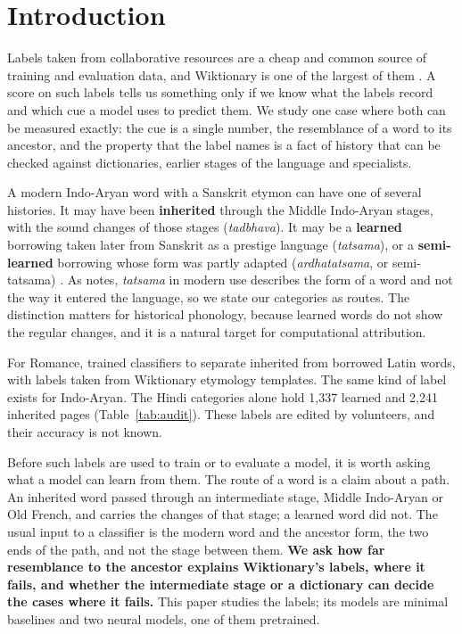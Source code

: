 \documentclass[11pt]{article}
\begin{document}
\section{Introduction}

Labels taken from collaborative resources are a cheap and common source of training and evaluation data, and Wiktionary is one of the largest of them \citep{wu2020computational}. A score on such labels tells us something only if we know what the labels record and which cue a model uses to predict them. We study one case where both can be measured exactly: the cue is a single number, the resemblance of a word to its ancestor, and the property that the label names is a fact of history that can be checked against dictionaries, earlier stages of the language and specialists.

A modern Indo-Aryan word with a Sanskrit etymon can have one of several histories. It may have been \textbf{inherited} through the Middle Indo-Aryan stages, with the sound changes of those stages (\textit{tadbhava}). It may be a \textbf{learned} borrowing taken later from Sanskrit as a prestige language (\textit{tatsama}), or a \textbf{semi-learned} borrowing whose form was partly adapted (\textit{ardhatatsama}, or semi-tatsama) \citep[\S111]{chatterji1926}. As \citeauthor{chatterji1926} notes, \textit{tatsama} in modern use describes the form of a word and not the way it entered the language, so we state our categories as routes. The distinction matters for historical phonology, because learned words do not show the regular changes, and it is a natural target for computational attribution.

For Romance, \citet{cristea2021inherited} trained classifiers to separate inherited from borrowed Latin words, with labels taken from Wiktionary etymology templates. The same kind of label exists for Indo-Aryan. The Hindi categories alone hold 1,337 learned and 2,241 inherited pages (Table~\ref{tab:audit}). These labels are edited by volunteers, and their accuracy is not known.

Before such labels are used to train or to evaluate a model, it is worth asking what a model can learn from them. The route of a word is a claim about a path. An inherited word passed through an intermediate stage, Middle Indo-Aryan or Old French, and carries the changes of that stage; a learned word did not. The usual input to a classifier is the modern word and the ancestor form, the two ends of the path, and not the stage between them. \textbf{We ask how far resemblance to the ancestor explains Wiktionary's labels, where it fails, and whether the intermediate stage or a dictionary can decide the cases where it fails.} This paper studies the labels; its models are minimal baselines and two neural models, one of them pretrained.
\end{document}
